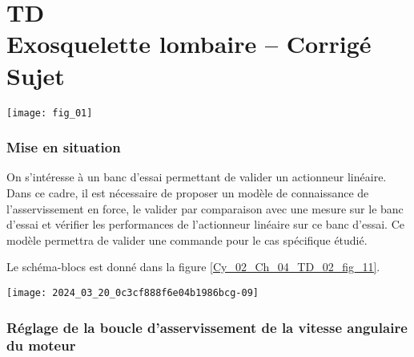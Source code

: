 \chapter*{TD  \\ 
Exosquelette lombaire -- 
\ifprof Corrigé \else Sujet \fi}

\iflivret {} \else
\ifprof  {} \else \fi
\fi

\setcounter{question}{0}

\begin{marginfigure}
\centering
\texttt{[image: fig\_01]}
\caption{Exosquelette lombaire Japet \label{Cy_02_Ch_04_TD_02_fig_01}}
\end{marginfigure}

\subsection*{Mise en situation}
\ifprof
\else
On s'intéresse à un banc d'essai permettant de valider un actionneur linéaire. 
Dans ce cadre, il est nécessaire de proposer un modèle de connaissance de l’asservissement en force, le valider par comparaison avec une mesure sur le banc d’essai et vérifier les performances de l’actionneur linéaire sur ce banc d’essai. Ce modèle permettra de valider une commande pour le cas spécifique étudié.

Le schéma-blocs est donné dans la figure \ref{Cy_02_Ch_04_TD_02_fig_11}.

\begin{figure*}[!h]
\texttt{[image: 2024\_03\_20\_0c3cf888f6e04b1986bcg-09]}
\caption{ Schéma-blocs de l’asservissement de force
 développée par un actionneur linéaire placé sur le banc d’essai \label{Cy_02_Ch_04_TD_02_fig_11}}
\end{figure*}

\fi


\subsection*{Réglage de la boucle d'asservissement de la vitesse angulaire du moteur}

